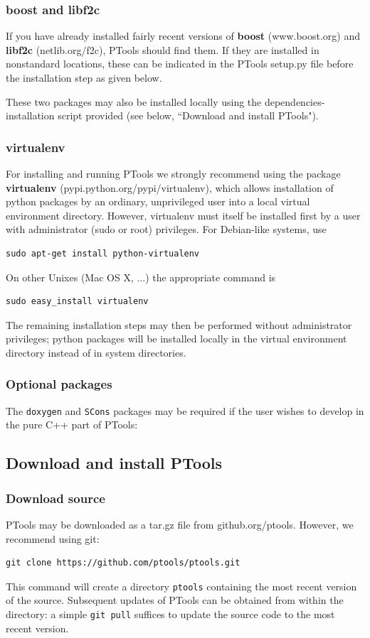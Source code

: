 \documentclass[12pt,a4paper]{article}
\begin{document}
\subsubsection*{boost and libf2c}
If you have already installed fairly recent versions of \textbf{boost} (www.boost.org) and \textbf{libf2c} (netlib.org/f2c), PTools should find them. If they are installed in nonstandard locations, these can be indicated in the PTools setup.py file before the installation step as given below.

These two packages may also be installed locally using the dependencies-installation script provided (see below, ``Download and install PTools").

\subsubsection*{virtualenv}
For installing and running PTools we strongly recommend using the package \textbf{virtualenv} (pypi.python.org/pypi/virtualenv), which allows installation of python packages by an ordinary, unprivileged user into a local virtual environment directory. However, virtualenv must itself be installed first by a user with administrator (sudo or root) privileges. For Debian-like systems, use
\begin{verbatim}
sudo apt-get install python-virtualenv
\end{verbatim}
On other Unixes (Mac OS X, ...) the appropriate command is
\begin{verbatim}
sudo easy_install virtualenv
\end{verbatim}
The remaining installation steps may then be performed without administrator privileges; python packages will be installed locally in the virtual environment directory instead of in system directories.

\subsubsection*{Optional packages}
The {\tt doxygen} and {\tt SCons} packages may be required if the user wishes to develop in the pure C++ part of PTools:

\subsection{Download and install PTools}

\subsubsection*{Download source}
PTools may be downloaded as a tar.gz file from github.org/ptools. However, we recommend using git:
\begin{verbatim}
git clone https://github.com/ptools/ptools.git
\end{verbatim}
This command will create a directory {\tt ptools} containing the most recent version of the source. Subsequent updates of PTools can be obtained from within the directory: a simple {\tt git pull} suffices to update the source code to the most recent version.
\end{document}
